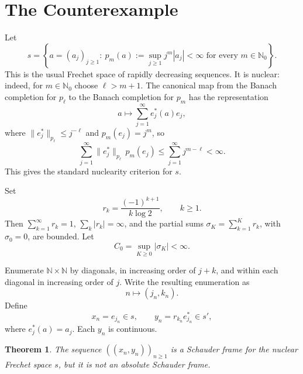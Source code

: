 \documentclass[11pt]{article}
\newtheorem{theorem}{Theorem}
\newcommand{\N}{\mathbb N}
\begin{document}
\section*{The Counterexample}

Let
\[
    s=\left\{a=(a_j)_{j\ge 1}:\ p_m(a):=\sup_{j\ge 1} j^m |a_j|<\infty
    \text{ for every } m\in\N_0\right\}.
\]
This is the usual Frechet space of rapidly decreasing sequences. It is nuclear: indeed, for \(m\in\N_0\) choose \(\ell>m+1\). The canonical map from the Banach completion for \(p_\ell\) to the Banach completion for \(p_m\) has the representation
\[
        a\mapsto \sum_{j=1}^{\infty} e_j^*(a)e_j,
\]
where \(\|e_j^*\|_{p_\ell}\le j^{-\ell}\) and \(p_m(e_j)=j^m\), so
\[
        \sum_{j=1}^{\infty} \|e_j^*\|_{p_\ell}\,p_m(e_j)
        \le \sum_{j=1}^{\infty} j^{m-\ell}<\infty.
\]
This gives the standard nuclearity criterion for \(s\).

Set
\[
        r_k=\frac{(-1)^{k+1}}{k\log 2},\qquad k\ge 1.
\]
Then \(\sum_{k=1}^{\infty} r_k=1\), \(\sum_k |r_k|=\infty\), and the partial sums
\(\sigma_K=\sum_{k=1}^K r_k\), with \(\sigma_0=0\), are bounded. Let
\[
        C_0=\sup_{K\ge 0} |\sigma_K|<\infty.
\]

Enumerate \(\N\times\N\) by diagonals, in increasing order of \(j+k\), and within each diagonal in increasing order of \(j\). Write the resulting enumeration as
\[
        n\mapsto (j_n,k_n).
\]
Define
\[
        x_n=e_{j_n}\in s,\qquad
        y_n=r_{k_n} e_{j_n}^*\in s',
\]
where \(e_j^*(a)=a_j\). Each \(y_n\) is continuous.

\begin{theorem}
The sequence \(((x_n,y_n))_{n\ge 1}\) is a Schauder frame for the nuclear Frechet space \(s\), but it is not an absolute Schauder frame.
\end{theorem}
\end{document}
